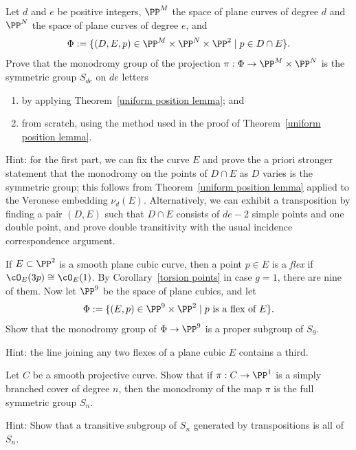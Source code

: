 \begin{exercise}
Let $d$ and $e$ be positive integers, $\PP^M$ the space of plane curves of degree $d$ and $\PP^N$ the space of plane curves of degree $e$, and
$$
\Phi := \{ (D, E, p) \in \PP^M \times \PP^N \times \PP^2 \mid p \in D \cap E \}.
$$
Prove that the monodromy group of the projection $\pi : \Phi \to \PP^M \times \PP^N$ is the symmetric group $S_{de}$ on $de$ letters
\begin{enumerate}
\item by applying Theorem~\ref{uniform position lemma}; and
\item from scratch, using the method used in the proof of Theorem~\ref{uniform position lemma}.
\end{enumerate}

Hint: for the first part, we can fix the curve $E$ and prove the a priori stronger statement that the monodromy on the points of $D \cap E$ as $D$ varies is the symmetric group; this follows from Theorem~\ref{uniform position lemma} applied to the Veronese embedding $\nu_d(E)$. Alternatively, we can exhibit a transposition by finding a pair $(D,E)$ such that $D \cap E$ consists of $de-2$ simple points and one double point, and prove double transitivity with the usual incidence correspondence argument.
\end{exercise}

\begin{exercise}
If $E \subset \PP^2$ is a smooth plane cubic curve, then a point $p \in E$ is  a \emph{flex} if $\cO_E(3p) \cong \cO_E(1)$. By Corollary~\ref{torsion points} in case $g=1$, there are nine of them. Now let $\PP^9$ be the space of plane cubics, and let
$$
\Phi := \{ (E, p) \in \PP^9 \times \PP^2 \mid p \text{ is a flex of } E \}.
$$
Show that the monodromy group of $\Phi \to \PP^9$ is a proper subgroup of $S_9$. 

Hint: the line joining any two flexes of a plane cubic $E$ contains a third.
\end{exercise}

\begin{exercise}
Let $C$ be a smooth projective curve. Show that if $\pi : C \to \PP^1$ is a simply branched cover of degree $n$, then the monodromy of the map $\pi$ is the full symmetric group $S_n$. 

Hint: Show that a transitive subgroup of $S_n$ generated by transpositions is all of $S_n$. 
\end{exercise}



